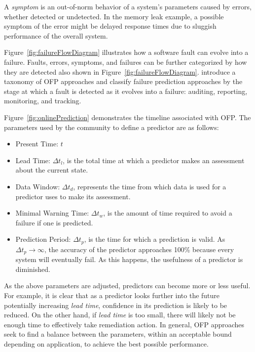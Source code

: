 A \emph{symptom} is an out-of-norm behavior of a system's parameters caused by
errors, whether detected or undetected.  In the memory leak example, a possible
symptom of the error might be delayed response times due to sluggish
performance of the overall system.


Figure~\ref{fig:failureFlowDiagram} illustrates how a software fault can evolve
into a failure.  Faults, errors, symptoms, and failures can be further
categorized by how they are detected also shown in
Figure~\ref{fig:failureFlowDiagram}.  \citet{salfnerSurvey} introduce a
taxonomy of \ac{OFP} approaches and classify failure prediction approaches by
the stage at which a fault is detected as it evolves into a failure: auditing,
reporting, monitoring, and tracking.


Figure~\ref{fig:onlinePrediction} demonstrates the timeline associated with
\ac{OFP}.  The parameters used by the community to define a predictor are as
follows:
\begin{itemize}
	\item{Present Time: $t$}
  \item{Lead Time: $\Delta t_{l}$, is the total time at which a predictor makes
  an assessment about the current state.}
  \item{Data Window: $\Delta t_{d}$, represents the time from which data is
  used for a predictor uses to make its assessment.}
  \item{Minimal Warning Time: $\Delta t_{w}$, is the amount of time required to
  avoid a failure if one is predicted.}
  \item{Prediction Period: $\Delta t_{p}$, is the time for which a prediction
  is valid.  As $\Delta t_{p} \rightarrow \infty$, the accuracy of the
  predictor approaches 100\% because every system will eventually fail.  As
  this happens, the usefulness of a predictor is diminished.}
\end{itemize}

As the above parameters are adjusted, predictors can become more or less
useful.  For example, it is clear that as a predictor looks further into the
future potentially increasing \emph{lead time}, confidence in its prediction is
likely to be reduced.  On the other hand, if \emph{lead time} is too small,
there will likely not be enough time to effectively take remediation action.
In general, \ac{OFP} approaches seek to find a balance between the parameters,
within an acceptable bound depending on application, to achieve the best
possible performance.

